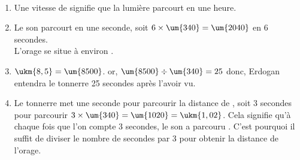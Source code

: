   \ \\ [-5mm]
   \begin{enumerate}
      \item Une vitesse de  signifie que {\blue la lumière parcourt  en une heure}.
      \item Le son parcourt  en une seconde, soit $6\times\um{340} =\um{2040}$ en 6 secondes. \\
         {\blue L'orage se situe à environ }.
      \item $\ukm{8,5} =\um{8500}$. or, $\um{8500}\div\um{340} =25$ donc,  {\blue Erdogan entendra le tonnerre 25 secondes après l'avoir vu}.
      \item Le tonnerre met une seconde pour parcourir la distance de , soit 3 secondes pour parcourir $3\times\um{340} =\um{1020} =\ukm{1,02}$. Cela signifie qu'à chaque fois que l'on compte 3 secondes, le son a parcouru . C'est pourquoi {\blue il suffit de diviser le nombre de secondes par 3 pour obtenir la distance de l'orage}.
   \end{enumerate}

\Coupe


